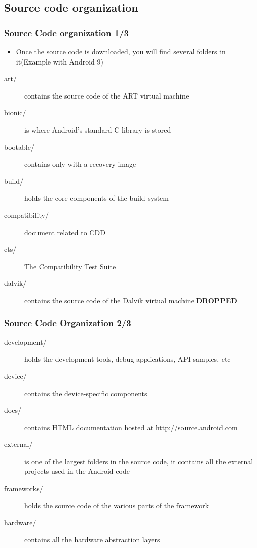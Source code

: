 \subsection{Source code organization}
\begin{frame}
  \frametitle{Source Code organization 1/3}
  \begin{itemize}
  \item Once the source code is downloaded, you will find several
    folders in it(Example with Android 9)
  \end{itemize}
  \begin{description}
  \item[art/] contains the source code of the ART virtual
    machine
  \item[bionic/] is where Android's standard C library is stored
  \item[bootable/] contains only with a recovery image
  \item[build/] holds the core components of the build system
  \item[compatibility/] document related to CDD
  \item[cts/] The Compatibility Test Suite
   \item[dalvik/] contains the source code of the Dalvik virtual
    machine[\textbf{DROPPED}]
  \end{description}
\end{frame}

\begin{frame}
  \frametitle{Source Code Organization 2/3}
  \begin{description}
  \item[development/] holds the development tools, debug applications,
    API samples, etc
  \item[device/] contains the device-specific components
  \item[docs/] contains HTML documentation hosted at
    \url{http://source.android.com}
  \item[external/] is one of the largest folders in the source code, it
    contains all the external projects used in the Android code
  \item[frameworks/] holds the source code of the various parts of the
    framework
  \item[hardware/] contains all the hardware abstraction layers
  \end{description}
\end{frame}

